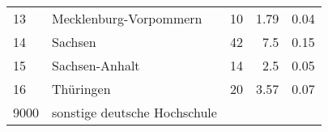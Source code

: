 \begin{longtable}{lXrrr}
     13 &
     \multicolumn{1}{X}{ Mecklenburg-Vorpommern   } &


       \num{10} &
       \num[round-mode=places,round-precision=2]{1,79} &
         \num[round-mode=places,round-precision=2]{0,04} \\

     14 &
     \multicolumn{1}{X}{ Sachsen   } &


       \num{42} &
       \num[round-mode=places,round-precision=2]{7,5} &
         \num[round-mode=places,round-precision=2]{0,15} \\

     15 &
     \multicolumn{1}{X}{ Sachsen-Anhalt   } &


       \num{14} &
       \num[round-mode=places,round-precision=2]{2,5} &
         \num[round-mode=places,round-precision=2]{0,05} \\

     16 &
     \multicolumn{1}{X}{ Thüringen   } &


       \num{20} &
       \num[round-mode=places,round-precision=2]{3,57} &
         \num[round-mode=places,round-precision=2]{0,07} \\

     9000 &
     \multicolumn{1}{X}{ sonstige deutsche Hochschule   } &



\end{longtable}
